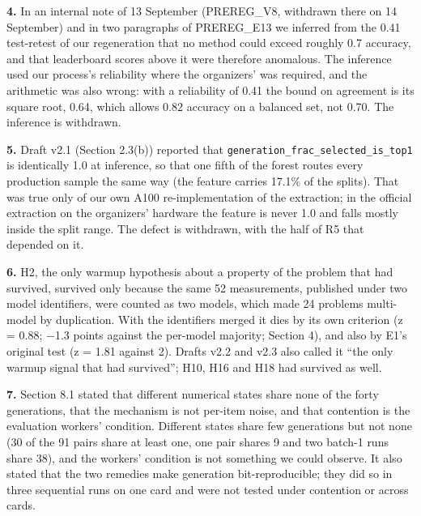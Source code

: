 \noindent\textbf{4.} In an internal note of 13 September (PREREG\_V8, withdrawn there on 14 September) and in two paragraphs of PREREG\_E13 we inferred from the 0.41 test-retest of our regeneration that no method could exceed roughly 0.7 accuracy, and that leaderboard scores above it were therefore anomalous. The inference used our process's reliability where the organizers' was required, and the arithmetic was also wrong: with a reliability of 0.41 the bound on agreement is its square root, 0.64, which allows 0.82 accuracy on a balanced set, not 0.70. The inference is withdrawn.
\par

\noindent\textbf{5.} Draft v2.1 (Section 2.3(b)) reported that \texttt{generation\_frac\_selected\_is\_top1} is identically 1.0 at inference, so that one fifth of the forest routes every production sample the same way (the feature carries 17.1\% of the splits). That was true only of our own A100 re-implementation of the extraction; in the official extraction on the organizers' hardware the feature is never 1.0 and falls mostly inside the split range. The defect is withdrawn, with the half of R5 that depended on it.
\par

\noindent\textbf{6.} H2, the only warmup hypothesis about a property of the problem that had survived, survived only because the same 52 measurements, published under two model identifiers, were counted as two models, which made 24 problems multi-model by duplication. With the identifiers merged it dies by its own criterion (z = 0.88; $-$1.3 points against the per-model majority; Section 4), and also by E1's original test (z = 1.81 against 2). Drafts v2.2 and v2.3 also called it ``the only warmup signal that had survived''; H10, H16 and H18 had survived as well.
\par

\noindent\textbf{7.} Section 8.1 stated that different numerical states share none of the forty generations, that the mechanism is not per-item noise, and that contention is the evaluation workers' condition. Different states share few generations but not none (30 of the 91 pairs share at least one, one pair shares 9 and two batch-1 runs share 38), and the workers' condition is not something we could observe. It also stated that the two remedies make generation bit-reproducible; they did so in three sequential runs on one card and were not tested under contention or across cards.
\par


